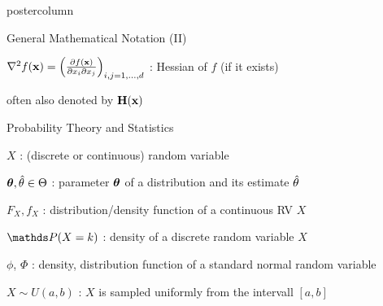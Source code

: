 \documentclass{beamer}
\begin{document}
\begin{frame}[fragile]{}
\begin{columns}
\begin{column}{.31\textwidth}
\begin{beamercolorbox}[center]{postercolumn}
\begin{minipage}{.98\textwidth}
{\begin{myblock}{General Mathematical Notation (II)}
						\begin{codebox}
							 $\nabla^2 f(\mathbf{x}) = \left(\frac{\partial f(\mathbf{x})}{\partial x_i \partial x_j}\right)_{i, j=1, ..., d}$ : Hessian of $f$ (if it exists)
						\end{codebox}
						\hspace*{1ex} often also denoted by $\mathbf{H}(\mathbf{x})$ \\
					\end{myblock}
						\vspace*{-2cm}
						\begin{myblock}{Probability Theory and Statistics}
						\begin{codebox}
							 $X$ : (discrete or continuous) random variable
						\end{codebox}
 						\hspace*{1ex} %
 						\hspace*{1ex}
						\begin{codebox}
							 $\bm{\theta}, \hat{\theta} \in \Theta$ : parameter $\bm{\theta}$ of a distribution and its estimate $\hat{\theta}$
						\end{codebox}
 						\hspace*{1ex}
						\begin{codebox}
							 $F_X, f_X$ : distribution/density function of a continuous RV $X$
						\end{codebox}
 						\hspace*{1ex} %
						\begin{codebox}
							 $\P(X = k)$ : density of a discrete random variable $X$
						\end{codebox}
 						\hspace*{1ex} %
						\begin{codebox}
							 $\phi$, $\Phi$ : density, distribution function of a standard normal random variable
						\end{codebox}
						\hspace*{1ex} %
						\begin{codebox}
							 $X \sim U(a, b)$ : $X$ is sampled uniformly from the intervall $[a, b]$
						\end{codebox}
						\hspace*{1ex}

\end{myblock}}
\end{minipage}
\end{beamercolorbox}
\end{column}
\end{columns}
\end{frame}
\end{document}
